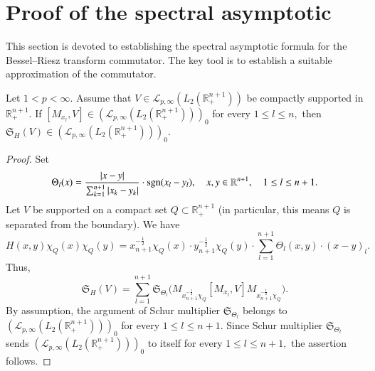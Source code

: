 \documentclass[12pt]{amsart}
\begin{document}
\section{Proof of the spectral asymptotic}\label{spect}
\setcounter{equation}{0}

This section is devoted to establishing the spectral asymptotic formula for the Bessel--Riesz transform commutator. The key tool is to establish a suitable approximation of the commutator.

\begin{lemma}\label{abcde}
Let $1<p<\infty$. Assume that $V\in \mathcal{L}_{p,\infty}(L_2(\mathbb{R}^{n+1}_+))$ be compactly supported in $\mathbb{R}^{n+1}_+.$ If
$[M_{x_l},V]\in (\mathcal{L}_{p,\infty}(L_2(\mathbb{R}^{n+1}_+)))_0$ for every $1\leq l\leq n,$ then $\mathfrak{S}_H(V)\in (\mathcal{L}_{p,\infty}(L_2(\mathbb{R}^{n+1}_+)))_0.$
\end{lemma}
\begin{proof} Set
$$\Theta_l(x)=\frac{|x-y|}{\sum_{k=1}^{n+1}|x_k-y_k|}\cdot {\rm sgn}(x_l-y_l),\quad x,y\in\mathbb{R}^{n+1},\quad 1\leq l\leq n+1.$$
Let $V$ be supported on a compact set $Q\subset \mathbb{R}^{n+1}_+$ (in particular, this means $Q$ is separated from the boundary). We have
$$H(x,y)\chi_Q(x)\chi_Q(y)=x_{n+1}^{-\frac12}\chi_Q(x)\cdot y_{n+1}^{-\frac12}\chi_Q(y)\cdot  \sum_{l=1}^{n+1}\Theta_l(x,y)\cdot (x-y)_l.$$
Thus,
$$\mathfrak{S}_H(V)=\sum_{l=1}^{n+1}\mathfrak{S}_{\Theta_l}\Big(M_{x_{n+1}^{-\frac12}\chi_Q} [M_{x_l},V] M_{x_{n+1}^{-\frac12}\chi_Q}\Big).$$
By assumption, the argument of Schur multiplier $\mathfrak{S}_{\Theta_l}$ belongs to $(\mathcal{L}_{p,\infty}(L_2(\mathbb{R}^{n+1}_+)))_0$ for every $1\leq l\leq n+1.$ Since Schur multiplier $\mathfrak{S}_{\Theta_l}$ sends $(\mathcal{L}_{p,\infty}(L_2(\mathbb{R}^{n+1}_+)))_0$ to itself for every $1\leq l\leq n+1,$ the assertion follows.
\end{proof}
\end{document}
